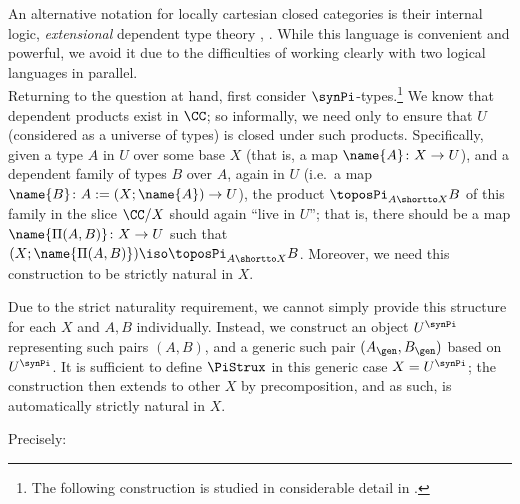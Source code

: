 An alternative notation for locally cartesian closed categories is their internal logic, \emph{extensional} dependent type theory \cite{seely:lcccs}, \cite{hofmann:on-the-interpretation}.  While this language is convenient and powerful, we avoid it due to the difficulties of working clearly with two logical languages in parallel.  \\

Returning to the question at hand, first consider $\synPi$-types.\footnote{The following construction is studied in considerable detail in \cite{voevodsky:products-from-universes}.}  We know that dependent products exist in $\CC$; so informally, we need only to ensure that $U$ (considered as a universe of types) is closed under such products.  Specifically, given a type $A$ in $U$ over some base $X$ (that is, a map $\name{A} \colon X \to U$), and a dependent family of types $B$ over $A$, again in $U$ (i.e.\ a map $\name{B} \colon A := (X;\name{A}) \to U$), the product $\toposPi_{A \shortto X} B$ of this family in the slice $\CC/X$ should again “live in $U$”; that is, there should be a map $\name{\Pi(A,B)} \colon X \to U$ such that $(X;\name{\Pi(A,B)}) \iso \toposPi_{A \shortto X} B$.  Moreover, we need this construction to be strictly natural in $X$.

Due to the strict naturality requirement, we cannot simply provide this structure for each $X$ and $A, B$ individually.  Instead, we construct an object $U^{\synPi}$ representing such pairs $(A,B)$, and a generic such pair $(A_\gen, B_\gen)$ based on $U^{\synPi}$.  It is sufficient to define $\PiStrux$ in this generic case $X = U^{\synPi}$; the construction then extends to other $X$ by precomposition, and as such, is automatically strictly natural in $X$.  

Precisely:

